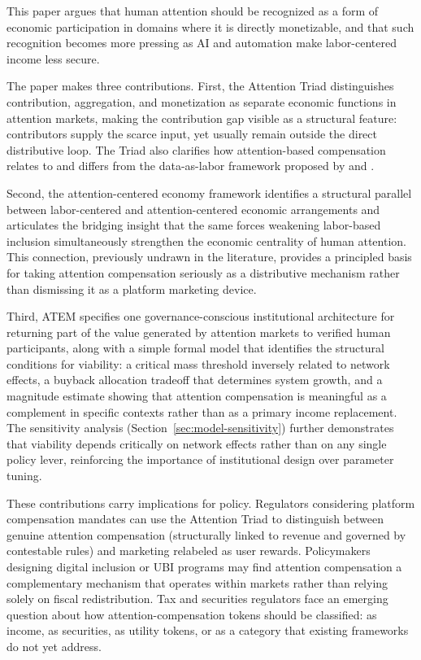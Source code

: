 \documentclass[12pt, a4paper]{article}
\begin{document}
This paper argues that human attention should be recognized as a form of economic participation in domains where it is directly monetizable, and that such recognition becomes more pressing as AI and automation make labor-centered income less secure.

The paper makes three contributions. First, the Attention Triad distinguishes contribution, aggregation, and monetization as separate economic functions in attention markets, making the contribution gap visible as a structural feature: contributors supply the scarce input, yet usually remain outside the direct distributive loop. The Triad also clarifies how attention-based compensation relates to and differs from the data-as-labor framework proposed by \citet{posner2018} and \citet{arrieta2018}.

Second, the attention-centered economy framework identifies a structural parallel between labor-centered and attention-centered economic arrangements and articulates the bridging insight that the same forces weakening labor-based inclusion simultaneously strengthen the economic centrality of human attention. This connection, previously undrawn in the literature, provides a principled basis for taking attention compensation seriously as a distributive mechanism rather than dismissing it as a platform marketing device.

Third, ATEM specifies one governance-conscious institutional architecture for returning part of the value generated by attention markets to verified human participants, along with a simple formal model that identifies the structural conditions for viability: a critical mass threshold inversely related to network effects, a buyback allocation tradeoff that determines system growth, and a magnitude estimate showing that attention compensation is meaningful as a complement in specific contexts rather than as a primary income replacement. The sensitivity analysis (Section~\ref{sec:model-sensitivity}) further demonstrates that viability depends critically on network effects rather than on any single policy lever, reinforcing the importance of institutional design over parameter tuning.

These contributions carry implications for policy. Regulators considering platform compensation mandates can use the Attention Triad to distinguish between genuine attention compensation (structurally linked to revenue and governed by contestable rules) and marketing relabeled as user rewards. Policymakers designing digital inclusion or UBI programs may find attention compensation a complementary mechanism that operates within markets rather than relying solely on fiscal redistribution. Tax and securities regulators face an emerging question about how attention-compensation tokens should be classified: as income, as securities, as utility tokens, or as a category that existing frameworks do not yet address.
\end{document}
